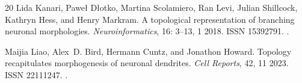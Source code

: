 \documentclass[11pt,a4paper]{article}
\begin{document}
\begin{thebibliography}{20}
Lida Kanari, Paweł Dłotko, Martina Scolamiero, Ran Levi, Julian Shillcock,
  Kathryn Hess, and Henry Markram.
\newblock A topological representation of branching neuronal morphologies.
\newblock \emph{Neuroinformatics}, 16: 3--13, 1 2018.
\newblock ISSN 15392791.
\newblock {}.

Maijia Liao, Alex~D. Bird, Hermann Cuntz, and Jonathon Howard.
\newblock Topology recapitulates morphogenesis of neuronal dendrites.
\newblock \emph{Cell Reports}, 42, 11 2023.
\newblock ISSN 22111247.
\newblock {}.

\end{thebibliography}
\end{document}

